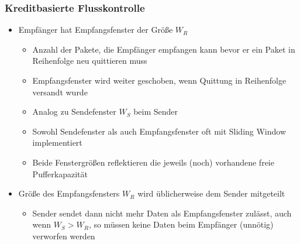     \subsubsection{Kreditbasierte Flusskontrolle}
      \begin{itemize}
        \item Empfänger hat Empfangsfenster der Größe $W_R$
          \begin{itemize}
            \item Anzahl der Pakete, die Empfänger empfangen kann bevor er ein Paket in Reihenfolge
              neu quittieren muss
            \item Empfangsfenster wird weiter geschoben, wenn Quittung in Reihenfolge versandt wurde
            \item Analog zu Sendefenster $W_S$ beim Sender
            \item Sowohl Sendefenster als auch Empfangsfenster oft mit Sliding Window implementiert
            \item Beide Fenstergrößen reflektieren die jeweils (noch) vorhandene freie Pufferkapazität
          \end{itemize}
        \item Größe des Empfangsfensters $W_R$ wird üblicherweise dem Sender mitgeteilt
          \begin{itemize}
            \item Sender sendet dann nicht mehr Daten als Empfangsfenster zulässt, auch wenn $W_S>W_R$,
              so müssen keine Daten beim Empfänger (unnötig) verworfen werden
          \end{itemize}
      \end{itemize}

